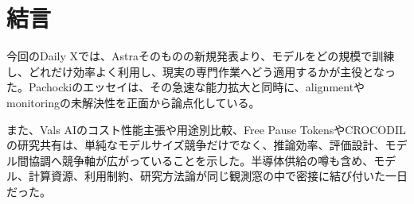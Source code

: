 \section{結言}
今回のDaily Xでは、Astraそのものの新規発表より、モデルをどの規模で訓練し、どれだけ効率よく利用し、現実の専門作業へどう適用するかが主役となった。Pachockiのエッセイは、その急速な能力拡大と同時に、alignmentやmonitoringの未解決性を正面から論点化している。

また、Vals AIのコスト性能主張や用途別比較、Free Pause TokensやCROCODILの研究共有は、単純なモデルサイズ競争だけでなく、推論効率、評価設計、モデル間協調へ競争軸が広がっていることを示した。半導体供給の噂も含め、モデル、計算資源、利用制約、研究方法論が同じ観測窓の中で密接に結び付いた一日だった。
